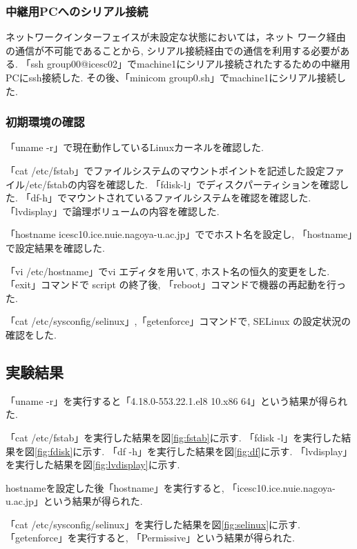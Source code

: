 \documentclass{ltjsarticle} %
\begin{document}
\subsubsection{中継用PCへのシリアル接続}
ネットワークインターフェイスが未設定な状態においては，ネット
ワーク経由の通信が不可能であることから, シリアル接続経由での通信を利用する必要がある. 
「ssh group00@icesc02」でmachine1にシリアル接続されたするための中継用PCにssh接続した. 
その後、「minicom group0.sh」でmachine1にシリアル接続した. 

\subsubsection{初期環境の確認}
「uname -r」で現在動作しているLinuxカーネルを確認した. 

「cat /etc/fstab」でファイルシステムのマウントポイントを記述した設定ファイル/etc/fstabの内容を確認した. 
「fdisk-l」でディスクパーティションを確認した. 
「df-h」でマウントされているファイルシステムを確認を確認した. 
「lvdisplay」で論理ボリュームの内容を確認した. 

「hostname icesc10.ice.nuie.nagoya-u.ac.jp」ででホスト名を設定し,
「hostname」で設定結果を確認した. 

「vi /etc/hostname」でvi エディタを用いて, ホスト名の恒久的変更をした. 
「exit」コマンドで script の終了後, 「reboot」コマンドで機器の再起動を行った. 

「cat /etc/sysconfig/selinux」,「getenforce」コマンドで, SELinux の設定状況の確認をした. 


\subsection{実験結果}
「uname -r」を実行すると「4.18.0-553.22.1.el8 10.x86 64」という結果が得られた. 

「cat /etc/fstab」を実行した結果を図\ref{fig:fstab}に示す. 
「fdisk -l」を実行した結果を図\ref{fig:fdisk}に示す. 
「df -h」を実行した結果を図\ref{fig:df}に示す. 
「lvdisplay」を実行した結果を図\ref{fig:lvdisplay}に示す. 

hostnameを設定した後「hostname」を実行すると, 「icesc10.ice.nuie.nagoya-u.ac.jp」という結果が得られた. 

「cat /etc/sysconfig/selinux」を実行した結果を図\ref{fig:selinux}に示す. 
「getenforce」を実行すると, 「Permissive」という結果が得られた. 
\end{document}
